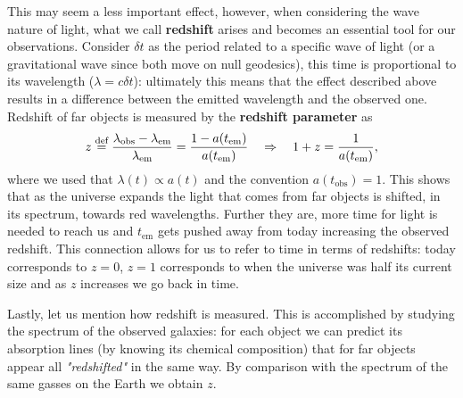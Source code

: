 This may seem a less important effect, however, when considering the wave nature of light, what we call \textbf{redshift} arises and becomes an essential tool for our observations. Consider $\delta t$ as the period related to a specific wave of light (or a gravitational wave since both move on null geodesics), this time is proportional to its wavelength ($\lambda= c\delta t$): ultimately this means that the effect described above results in a difference between the emitted wavelength and the observed one.\\Redshift of far objects is measured by the \textbf{redshift parameter} as
\begin{equation}
    \label{eq:redshift}
    z\stackrel{\text{def}}{=}\frac{\lambda_{\text{obs}}-\lambda_{\text{em}}}{\lambda_{\text{em}}}=\frac{1-a(t_{\text{em}})}{a(t_\text{em})}\quad\Rightarrow\quad 1+z=\frac{1}{a(t_{\text{em}})},
\end{equation}
where we used that $\lambda(t)\propto a(t)$ and the convention $a(t_\text{obs})=1$. This shows that as the universe expands the light that comes from far objects is shifted, in its spectrum, towards red wavelengths. Further they are, more time for light is needed to reach us and $t_\text{em}$ gets pushed away from today increasing the observed redshift. This connection allows for us to refer to time in terms of redshifts: today corresponds to $z=0$, $z=1$ corresponds to when the universe was half its current size and as $z$ increases we go back in time.

Lastly, let us mention how redshift is measured. This is accomplished by studying the spectrum of the observed galaxies: for each object we can predict its absorption lines (by knowing its chemical composition) that for far objects appear all \emph{"redshifted"} in the same way. By comparison with the spectrum of the same gasses on the Earth we obtain $z$. 